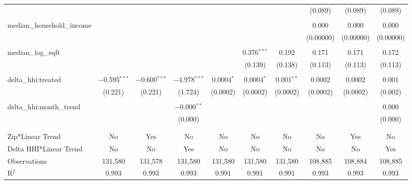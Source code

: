 \begin{table}[H]
{\begin{tabular}{@{\extracolsep{5pt}}lccccccccc}
   &  &  &  &  &  &  & (0.089) & (0.089) & (0.089) \\  

   & & & & & & & & & \\  

  median\_household\_income &  &  &  &  &  &  & 0.000 & 0.000 & 0.000 \\  

   &  &  &  &  &  &  & (0.00000) & (0.00000) & (0.00000) \\  

   & & & & & & & & & \\  

  median\_log\_sqft &  &  &  &  & 0.376$^{***}$ & 0.192 & 0.171 & 0.171 & 0.172 \\  

   &  &  &  &  & (0.139) & (0.138) & (0.113) & (0.113) & (0.113) \\  

   & & & & & & & & & \\  

  delta\_hhi:treated & $-$0.595$^{***}$ & $-$0.600$^{***}$ & $-$4.978$^{***}$ & 0.0004$^{*}$ & 0.0004$^{*}$ & 0.001$^{**}$ & 0.0002 & 0.0002 & 0.001 \\  

   & (0.221) & (0.221) & (1.724) & (0.0002) & (0.0002) & (0.0002) & (0.0002) & (0.0002) & (0.002) \\  

   & & & & & & & & & \\  

  delta\_hhi:month\_trend &  &  & $-$0.000$^{**}$ &  &  &  &  &  & 0.000 \\  

   &  &  & (0.000) &  &  &  &  &  & (0.000) \\  

   & & & & & & & & & \\  

 \hline \\[-1.8ex]  

 Zip*Linear Trend & No & Yes & No & No & No & No & No & Yes & No \\  

 Delta HHI*Linear Trend & No & No & Yes & No & No & No & No & No & Yes \\  

 Observations & 131,580 & 131,578 & 131,580 & 131,580 & 131,580 & 131,580 & 108,885 & 108,884 & 108,885 \\  

 R$^{2}$ & 0.993 & 0.993 & 0.993 & 0.991 & 0.991 & 0.991 & 0.993 & 0.993 & 0.993 \\  


\end{tabular}}
\end{table}
